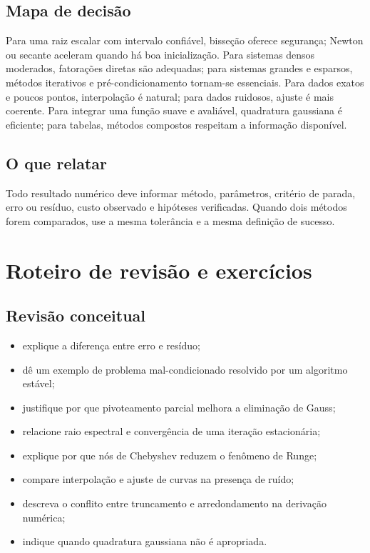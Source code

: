 \documentclass[12pt,a4paper,openany]{book}
\begin{document}
\section{Mapa de decisão}



Para uma raiz escalar com intervalo confiável, bisseção oferece segurança; Newton ou secante aceleram quando há boa inicialização. Para sistemas densos moderados, fatorações diretas são adequadas; para sistemas grandes e esparsos, métodos iterativos e pré-condicionamento tornam-se essenciais. Para dados exatos e poucos pontos, interpolação é natural; para dados ruidosos, ajuste é mais coerente. Para integrar uma função suave e avaliável, quadratura gaussiana é eficiente; para tabelas, métodos compostos respeitam a informação disponível.



\section{O que relatar}



Todo resultado numérico deve informar método, parâmetros, critério de parada, erro ou resíduo, custo observado e hipóteses verificadas. Quando dois métodos forem comparados, use a mesma tolerância e a mesma definição de sucesso.



\chapter{Roteiro de revisão e exercícios}



\section{Revisão conceitual}



\begin{itemize}
\item explique a diferença entre erro e resíduo;
\item dê um exemplo de problema mal-condicionado resolvido por um algoritmo estável;
\item justifique por que pivoteamento parcial melhora a eliminação de Gauss;
\item relacione raio espectral e convergência de uma iteração estacionária;
\item explique por que nós de Chebyshev reduzem o fenômeno de Runge;
\item compare interpolação e ajuste de curvas na presença de ruído;
\item descreva o conflito entre truncamento e arredondamento na derivação numérica;
\item indique quando quadratura gaussiana não é apropriada.
\end{itemize}
\end{document}
